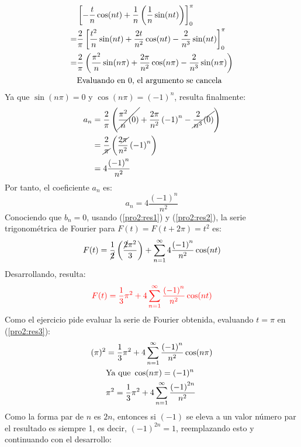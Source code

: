 \begin{multicols}{2}
\begin{align*}
    &\left[-\frac{t}{n}\cos(nt) + \frac{1}{n} \left(\frac{1}{n} \sin(nt)\right) \right]_{0}^{\pi}\\
    =& \frac{2}{\pi} \left[\frac{t^{2}}{n} \sin(nt) + \frac{2t}{n^{2}} \cos(nt) - \frac{2}{n^{3}} \sin(nt)\right]_{0}^{\pi}\\
    =& \frac{2}{\pi} \left(\frac{\pi^{2}}{n} \sin(n\pi) + \frac{2\pi}{n^{2}} \cos(n\pi) - \frac{2}{n^{3}} \sin(n\pi)\right)\\
    &\textup{Evaluando en 0, el argumento se cancela}
\end{align*}
Ya que $\sin(n\pi) = 0$ y $\cos(n\pi) = (-1)^{n}$, resulta finalmente:
\begin{align*}
    a_n &= \frac{2}{\pi} \left(\cancel{\frac{\pi^{2}}{n}(0)} + \frac{2\pi}{n^{2}}\left(-1\right)^{n} - \cancel{\frac{2}{n^{3}}(0)}\right)\\
    &= \frac{2}{\cancel{\pi}} \left(\frac{2\cancel{\pi}}{n^{2}}\left(-1\right)^{n}\right)\\
    &= 4 \frac{\left(-1\right)^{n}}{n^{2}}
\end{align*}
Por tanto, el coeficiente $a_n$ es:
\begin{equation}
    a_n = 4 \frac{\left(-1\right)^{n}}{n^{2}} \label{pro2:res2}
\end{equation}
Conociendo que $b_n = 0$, usando (\ref{pro2:res1}) y (\ref{pro2:res2}), la serie trigonométrica de Fourier para $F(t) = F(t + 2\pi) = t^{2}$ es:
\begin{equation*}
    F(t) = \frac{1}{\cancel{2}}\left(\frac{\cancel{2}\pi^{2}}{3}\right) + \sum_{n = 1}^{\infty} 4 \frac{\left(-1\right)^{n}}{n^{2}} \cos(nt)
\end{equation*}
Desarrollando, resulta:
\begin{equation}
    \textcolor{rojo}{F(t) = \frac{1}{3}\pi^{2} + 4 \sum_{n = 1}^{\infty} \frac{\left(-1\right)^{n}}{n^{2}} \cos(nt)} \label{pro2:res3}
\end{equation}
Como el ejercicio pide evaluar la serie de Fourier obtenida, evaluando $t = \pi$ en (\ref{pro2:res3}):
\begin{align*}
    (\pi)^{2} &= \frac{1}{3}\pi^{2} + 4 \sum_{n = 1}^{\infty} \frac{\left(-1\right)^{n}}{n^{2}} \cos(n\pi)\\
    &\textup{Ya que } \cos(n\pi) = (-1)^{n}\\
    &\pi^{2} = \frac{1}{3}\pi^{2} + 4 \sum_{n = 1}^{\infty} \frac{\left(-1\right)^{2n}}{n^{2}}
\end{align*}
Como la forma par de $n$ es $2n$, entonces si $(-1)$ se eleva a un valor número par el resultado es siempre 1, es decir, $(-1)^{2n} = 1$, reemplazando esto y continuando con el desarrollo:

\end{multicols}
